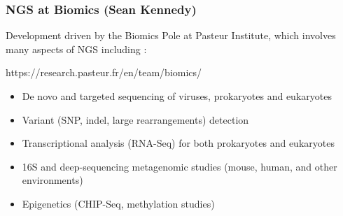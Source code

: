 \begin{frame}
    \frametitle{NGS at Biomics (Sean Kennedy)}

 Development driven by the Biomics Pole at Pasteur Institute, which involves
 many aspects of NGS including :

 \tiny
 \begin{block}{https://research.pasteur.fr/en/team/biomics/}
  \begin{itemize}
  \item De novo and targeted sequencing of viruses, prokaryotes and eukaryotes
  \item Variant (SNP, indel, large rearrangements) detection
  \item Transcriptional analysis (RNA-Seq) for both prokaryotes and eukaryotes
  \item 16S and deep-sequencing metagenomic studies (mouse, human, and other
environments)
  \item Epigenetics (CHIP-Seq, methylation studies)
  \end{itemize}
 \end{block}
 \small
\end{frame}
